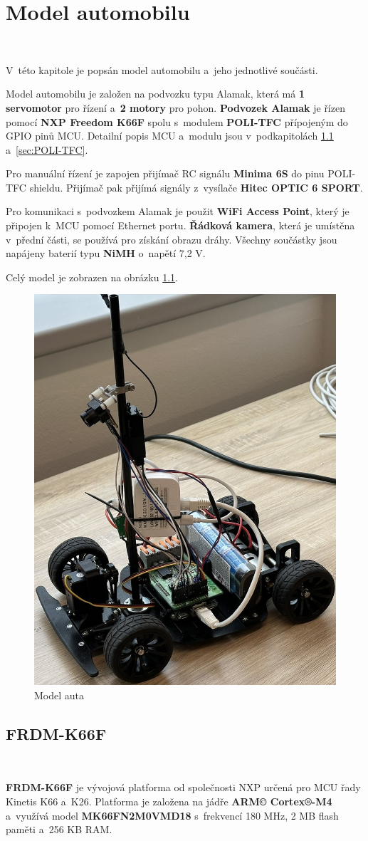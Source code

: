 \chapter{Model automobilu}
\label{sec:CarModel}\

V~této kapitole je popsán model automobilu a~jeho jednotlivé součásti.

Model automobilu je založen na podvozku typu Alamak, která má \textbf{1 servomotor}
pro řízení a~\textbf{2 motory} pro pohon. \textbf{Podvozek Alamak} je řízen pomocí 
\textbf{NXP Freedom K66F} \cite{frdmk66UserGuide} spolu s~modulem \textbf{POLI-TFC} 
přípojeným do GPIO pinů MCU. Detailní popis MCU a~modulu jsou v~podkapitolách 
\ref{sec:FRDM-K66F} a~\ref{sec:POLI-TFC}.

Pro manuální řízení je zapojen přijímač RC signálu \textbf{Minima 6S} do pinu
POLI-TFC shieldu. Přijímač pak přijímá signály z~vysílače \textbf{Hitec OPTIC 6 
SPORT}.

Pro komunikaci s~podvozkem Alamak je použit \textbf{WiFi Access Point}, který je
připojen k~MCU pomocí Ethernet portu. \textbf{Řádková kamera}, která je umístěna
v~přední části, se používá pro získání obrazu dráhy. Všechny součástky
jsou napájeny baterií typu \textbf{NiMH} o~napětí 7,2 V.

Celý model je zobrazen na obrázku \ref{fig:car}.
\begin{figure}[!h]
    \centering
    \includegraphics[width = .4\linewidth]{Figures/Car.jpeg}
    \caption{Model auta}
    \label{fig:car}
\end{figure}

\section{FRDM-K66F}
\label{sec:FRDM-K66F}\

\textbf{FRDM-K66F} je vývojová platforma od společnosti NXP určená pro MCU řady 
Kinetis K66 a~K26. Platforma je založena na jádře \textbf{ARM© Cortex®-M4}
a~využívá model \textbf{MK66FN2M0VMD18} s~frekvencí 180 MHz, 2 MB flash paměti
a~256 KB RAM.

